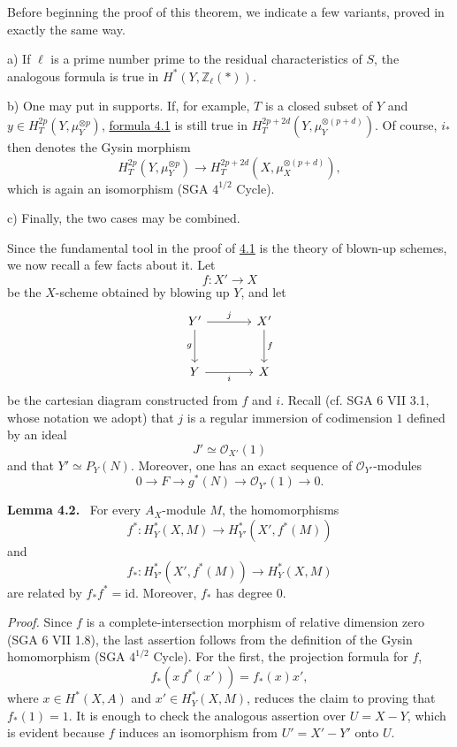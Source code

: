 \documentclass[11pt]{article}
\newenvironment{statement}[1]{\par\medskip\noindent\textbf{#1.}\ }{\par\medskip}
\begin{document}
Before beginning the proof of this theorem, we indicate a few variants, proved in exactly the same way.

a) If $\ell$ is a prime number prime to the residual characteristics of $S$, the analogous formula is true in $H^*(Y,\mathbb Z_\ell(*))$.

b) One may put in supports. If, for example, $T$ is a closed subset of $Y$ and $y\in H_T^{2p}(Y,\mu_Y^{\otimes p})$, \hyperref[sga5:VII:theorem:4.1]{formula 4.1} is still true in $H_T^{2p+2d}(Y,\mu_Y^{\otimes(p+d)})$. Of course, $i_*$ then denotes the Gysin morphism
\[
H_T^{2p}(Y,\mu_Y^{\otimes p})
\to H_T^{2p+2d}(X,\mu_X^{\otimes(p+d)}),
\]
which is again an isomorphism (SGA $4^{1/2}$ Cycle).

c) Finally, the two cases may be combined.

Since the fundamental tool in the proof of \hyperref[sga5:VII:theorem:4.1]{4.1} is the theory of blown-up schemes, we now recall a few facts about it. Let
\[
f:X'\to X
\]
be the $X$-scheme obtained by blowing up $Y$, and let
\[
\begin{tikzcd}[column sep=large,row sep=large]
Y' \arrow[r,"j"] \arrow[d,"g"'] & X' \arrow[d,"f"]\\
Y \arrow[r,"i"'] & X
\end{tikzcd}
\]
be the cartesian diagram constructed from $f$ and $i$. Recall (cf. SGA 6 VII 3.1, whose notation we adopt) that $j$ is a regular immersion of codimension $1$ defined by an ideal
\[
J'\simeq\mathcal O_{X'}(1)
\]
and that $Y'\simeq P_Y(N)$. Moreover, one has an exact sequence of $\mathcal O_{Y'}$-modules
\[
0\to F\to g^*(N)\to \mathcal O_{Y'}(1)\to0.
\]

\label{sga5:VII:lemma:4.2}\begin{statement}{Lemma 4.2}
For every $A_X$-module $M$, the homomorphisms
\[
f^*:H_Y^*(X,M)\to H_{Y'}^*(X',f^*(M))
\]
and
\[
f_*:H_{Y'}^*(X',f^*(M))\to H_Y^*(X,M)
\]
are related by $f_*f^*=\mathrm{id}$. Moreover, $f_*$ has degree $0$.
\end{statement}

\emph{Proof.} Since $f$ is a complete-intersection morphism of relative dimension zero (SGA 6 VII 1.8), the last assertion follows from the definition of the Gysin homomorphism (SGA $4^{1/2}$ Cycle). For the first, the projection formula for $f$,
\[
f_*(x\,f^*(x'))=f_*(x)x',
\]
where $x\in H^*(X,A)$ and $x'\in H_Y^*(X,M)$, reduces the claim to proving that $f_*(1)=1$. It is enough to check the analogous assertion over $U=X-Y$, which is evident because $f$ induces an isomorphism from $U'=X'-Y'$ onto $U$.
\end{document}
